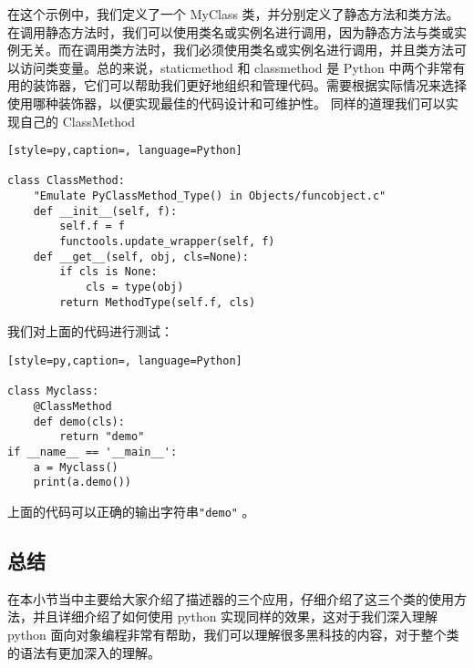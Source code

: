 在这个示例中，我们定义了一个 MyClass 类，并分别定义了静态方法和类方法。在调用静态方法时，我们可以使用类名或实例名进行调用，因为静态方法与类或实例无关。而在调用类方法时，我们必须使用类名或实例名进行调用，并且类方法可以访问类变量。总的来说，staticmethod 和 classmethod 是 Python 中两个非常有用的装饰器，它们可以帮助我们更好地组织和管理代码。需要根据实际情况来选择使用哪种装饰器，以便实现最佳的代码设计和可维护性。
同样的道理我们可以实现自己的 ClassMethod
\begin{lstlisting}[style=py,caption=, language=Python]

class ClassMethod:
    "Emulate PyClassMethod_Type() in Objects/funcobject.c"
    def __init__(self, f):
        self.f = f
        functools.update_wrapper(self, f)
    def __get__(self, obj, cls=None):
        if cls is None:
            cls = type(obj)
        return MethodType(self.f, cls)
\end{lstlisting}
我们对上面的代码进行测试：
\begin{lstlisting}[style=py,caption=, language=Python]

class Myclass:
    @ClassMethod
    def demo(cls):
        return "demo"
if __name__ == '__main__':
    a = Myclass()
    print(a.demo())
\end{lstlisting}
上面的代码可以正确的输出字符串\verb|"demo"| 。
\subsection{总结}
在本小节当中主要给大家介绍了描述器的三个应用，仔细介绍了这三个类的使用方法，并且详细介绍了如何使用 python 实现同样的效果，这对于我们深入理解 python 面向对象编程非常有帮助，我们可以理解很多黑科技的内容，对于整个类的语法有更加深入的理解。
